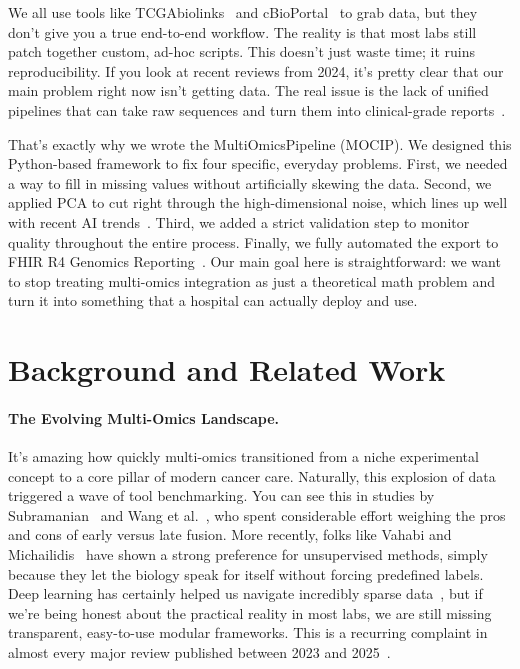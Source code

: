 \documentclass[12pt,a4paper,onecolumn]{article}
\begin{document}
We all use tools like TCGAbiolinks~\cite{colaprico2016} and cBioPortal~\cite{cerami2012} to grab data, but they don't give you a true end-to-end workflow. The reality is that most labs still patch together custom, ad-hoc scripts. This doesn't just waste time; it ruins reproducibility. If you look at recent reviews from 2024, it's pretty clear that our main problem right now isn't getting data. The real issue is the lack of unified pipelines that can take raw sequences and turn them into clinical-grade reports~\cite{abdelaziz2024multi,hernandez2024methods}.

That's exactly why we wrote the MultiOmicsPipeline (MOCIP). We designed this Python-based framework to fix four specific, everyday problems. First, we needed a way to fill in missing values without artificially skewing the data. Second, we applied PCA to cut right through the high-dimensional noise, which lines up well with recent AI trends~\cite{nam2024harnessing}. Third, we added a strict validation step to monitor quality throughout the entire process. Finally, we fully automated the export to FHIR R4 Genomics Reporting~\cite{mandel2016}. Our main goal here is straightforward: we want to stop treating multi-omics integration as just a theoretical math problem and turn it into something that a hospital can actually deploy and use.

\section{Background and Related Work}

\paragraph{The Evolving Multi-Omics Landscape.}
It's amazing how quickly multi-omics transitioned from a niche experimental concept to a core pillar of modern cancer care. Naturally, this explosion of data triggered a wave of tool benchmarking. You can see this in studies by Subramanian~\cite{subramanian2020} and Wang et al.~\cite{wang2021evaluation}, who spent considerable effort weighing the pros and cons of early versus late fusion. More recently, folks like Vahabi and Michailidis~\cite{vahabi2022unsupervised} have shown a strong preference for unsupervised methods, simply because they let the biology speak for itself without forcing predefined labels. Deep learning has certainly helped us navigate incredibly sparse data~\cite{kang2022roadmap}, but if we're being honest about the practical reality in most labs, we are still missing transparent, easy-to-use modular frameworks. This is a recurring complaint in almost every major review published between 2023 and 2025~\cite{wekesa2023review,abdelaziz2024multi,muneer2025review}.
\end{document}
